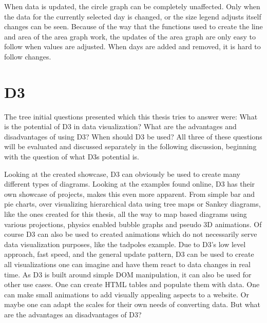 When data is updated, the circle graph can be completely unaffected. Only when the data for the currently selected day is changed, or the size legend adjusts itself changes can be seen. Because of the way that the functions used to create the line and area of the area graph work, the updates of the area graph are only easy to follow when values are adjusted. When days are added and removed, it is hard to follow changes.


\section{D3}
The tree initial questions presented which this thesis tries to answer were: What is the potential of D3 in data visualization? What are the advantages and disadvantages of using D3? When should D3 be used? All three of these questions will be evaluated and discussed separately in the following discussion, beginning with the question of what D3s potential is. 

Looking at the created showcase, D3 can obviously be used to create many different types of diagrams. Looking at the examples found online, D3 has their own showcase of projects, makes this even more apparent. From simple bar and pie charts, over visualizing hierarchical data using tree maps or Sankey diagrams, like the ones created for this thesis, all the way to map based diagrams using various projections\cite{davies}, physics enabled bubble graphs\cite{carter_2012} and pseudo 3D animations\cite{davies_sphere}. Of course D3 can also be used to created animations which do not necessarily serve data visualization purposes, like the tadpoles example\cite{bostock_2020}. Due to D3's low level approach, fast speed, and the general update pattern, D3 can be used to create all visualizations one can imagine and have them react to data changes in real time. As D3 is built around simple DOM manipulation, it can also be used for other use cases. One can create HTML tables and populate them with data. One can make small animations to add visually appealing aspects to a website. Or maybe one can adapt the scales for their own needs of converting data. But what are the advantages an disadvantages of D3?

